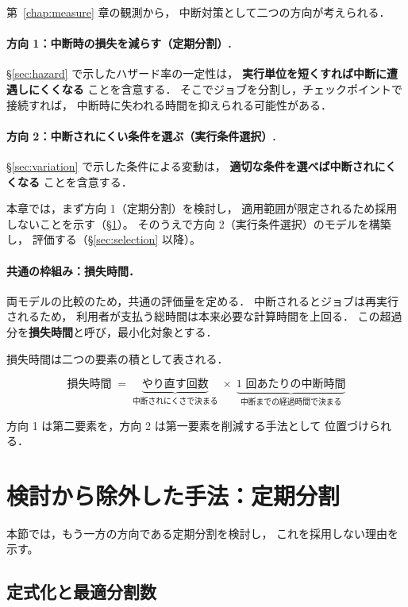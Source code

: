 \documentclass[11pt,a4paper]{ltjsreport}
\begin{document}
第~\ref{chap:measure} 章の観測から，
中断対策として二つの方向が考えられる．

\paragraph{方向 1：中断時の損失を減らす（定期分割）.}
\S\ref{sec:hazard} で示したハザード率の一定性は，
\textbf{実行単位を短くすれば中断に遭遇しにくくなる}
ことを含意する．
そこでジョブを分割し，チェックポイントで接続すれば，
中断時に失われる時間を抑えられる可能性がある．

\paragraph{方向 2：中断されにくい条件を選ぶ（実行条件選択）.}
\S\ref{sec:variation} で示した条件による変動は，
\textbf{適切な条件を選べば中断されにくくなる}
ことを含意する．

本章では，まず方向 1（定期分割）を検討し，
適用範囲が限定されるため採用しないことを示す（\S\ref{sec:split}）。
そのうえで方向 2（実行条件選択）のモデルを構築し，
評価する（\S\ref{sec:selection} 以降）。

\paragraph{共通の枠組み：損失時間．}
両モデルの比較のため，共通の評価量を定める．
中断されるとジョブは再実行されるため，
利用者が支払う総時間は本来必要な計算時間を上回る．
この超過分を\textbf{損失時間}と呼び，最小化対象とする．

損失時間は二つの要素の積として表される．

\begin{equation}
\text{損失時間} \;=\;
\underbrace{\text{やり直す回数}}_{\text{中断されにくさで決まる}}
\;\times\;
\underbrace{\text{1 回あたりの中断時間}}_{\text{中断までの経過時間で決まる}}
\label{eq:waste_concept}
\end{equation}

方向 1 は第二要素を，方向 2 は第一要素を削減する手法として
位置づけられる．

\section{検討から除外した手法：定期分割}
\label{sec:split}

本節では，もう一方の方向である定期分割を検討し，
これを採用しない理由を示す。

\subsection{定式化と最適分割数}
\end{document}
